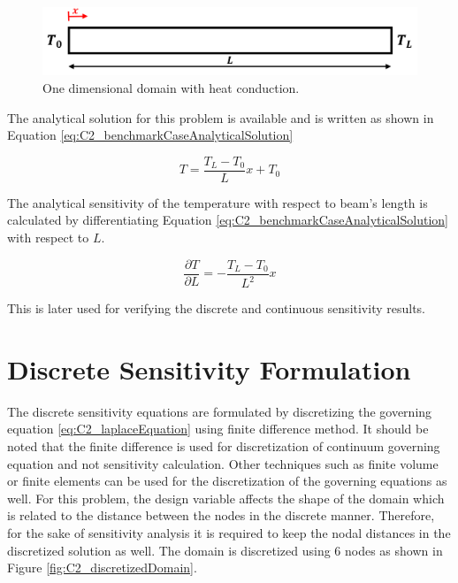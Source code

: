 \begin{figure}[h]
	\centering
	\includegraphics[width=14.00cm]{Chapter_2/figure/benchmark_case.png}
	\caption{One dimensional domain with heat conduction.}
	\label{fig:C2_benchmarkCase}
\end{figure}

The analytical solution for this problem is available and is written as shown in Equation \eqref{eq:C2_benchmarkCaseAnalyticalSolution}

\begin{equation}\label{eq:C2_benchmarkCaseAnalyticalSolution}
	T = \frac{T_L - T_0}{L} x + T_0
\end{equation}

The analytical sensitivity of the temperature with respect to beam's length is calculated by differentiating Equation \eqref{eq:C2_benchmarkCaseAnalyticalSolution} with respect to $L$.

\begin{equation}
	\frac{\partial T}{\partial L} = -\frac{T_L - T_0}{L^2} x
\end{equation}

This is later used for verifying the discrete and continuous sensitivity results.

\section{Discrete Sensitivity Formulation}
The discrete sensitivity equations are formulated by discretizing the governing equation \eqref{eq:C2_laplaceEquation} using finite difference method. It should be noted that the finite difference is used for discretization of continuum governing equation and not sensitivity calculation. Other techniques such as finite volume or finite elements can be used for the discretization of the governing equations as well. For this problem, the design variable affects the shape of the domain which is related to the distance between the nodes in the discrete manner. Therefore, for the sake of sensitivity analysis it is required to keep the nodal distances in the discretized solution as well. The domain is discretized using 6 nodes as shown in Figure \ref{fig:C2_discretizedDomain}.

